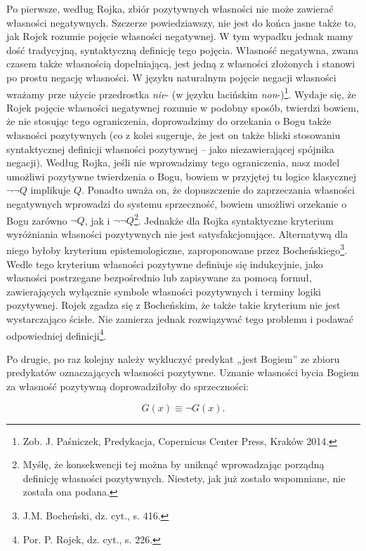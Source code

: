 Po pierwsze, według Rojka, zbiór pozytywnych własności nie może zawierać
własności negatywnych. Szczerze powiedziawszy, nie jest do końca jasne
także to, jak Rojek rozumie pojęcie własności negatywnej. W tym wypadku
jednak mamy dość tradycyjną, syntaktyczną definicję tego pojęcia.
Własność negatywna, zwana czasem także własnością dopełniającą, jest
jedną z własności złożonych i stanowi po prostu negację własności. W
języku naturalnym pojęcie negacji własności wrażamy prze użycie
przedrostka \textit{nie}- (w języku łacińskim
\textit{non}-)\footnote{Zob. J. Paśniczek, Predykacja, Copernicus
Center Press, Kraków 2014. }. Wydaje się, że Rojek pojęcie
własności negatywnej rozumie w podobny sposób, twierdzi bowiem, że nie
stosując tego ograniczenia, doprowadzimy do orzekania o Bogu także
własności pozytywnych (co z kolei sugeruje, że jest on także bliski
stosowaniu syntaktycznej definicji własności pozytywnej -- jako
niezawierającej spójnika negacji). Według Rojka, jeśli nie wprowadzimy
tego ograniczenia, nasz model umożliwi pozytywne twierdzenia o Bogu,
bowiem w przyjętej tu logice klasycznej $\neg \neg Q$
implikuje $Q$. Ponadto uważa on, że dopuszczenie do
zaprzeczania własności negatywnych wprowadzi do systemu sprzeczność,
bowiem umożliwi orzekanie o Bogu zarówno $\neg Q$, jak i
$\neg \neg Q$\footnote{Myślę, że
konsekwencji tej można by uniknąć wprowadzając porządną definicję
własności pozytywnych. Niestety, jak już zostało wspomniane, nie
została ona podana. }. Jednakże dla Rojka syntaktyczne kryterium
wyróżniania własności pozytywnych nie jest satysfakcjonujące.
Alternatywą dla niego byłoby kryterium epistemologiczne, zaproponowane
przez Bocheńskiego\footnote{J.M. Bocheński, dz. cyt., s. 416. }.
Wedle tego kryterium własności pozytywne definiuje się indukcyjnie,
jako własności postrzegane bezpośrednio lub zapisywane za pomocą
formuł, zawierających wyłącznie symbole własności pozytywnych i terminy
logiki pozytywnej. Rojek zgadza się z Bocheńskim, że także takie
kryterium nie jest wystarczająco ścisłe. Nie zamierza jednak
rozwiązywać tego problemu i podawać odpowiedniej definicji\footnote{
Por. P. Rojek, dz. cyt., s. 226. }.

Po drugie, po raz kolejny należy wykluczyć predykat „jest Bogiem” ze
zbioru predykatów oznaczających własności pozytywne. Uznanie własności
bycia Bogiem za własność pozytywną doprowadziłoby do sprzeczności:

\begin{equation}
    G(x) \equiv \neg G(x).
\end{equation}


